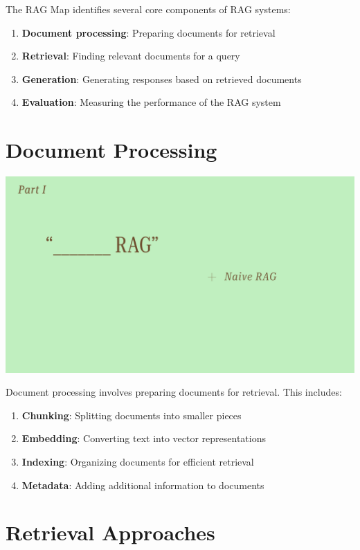 \documentclass[
  letterpaper,
  oneside]{scrbook}
\providecommand{\tightlist}{%
  \setlength{\itemsep}{0pt}\setlength{\parskip}{0pt}}\usepackage{longtable,booktabs,array}
\begin{document}
The RAG Map identifies several core components of RAG systems:

\begin{enumerate}
\def\labelenumi{\arabic{enumi}.}
\tightlist
\item
  \textbf{Document processing}: Preparing documents for retrieval
\item
  \textbf{Retrieval}: Finding relevant documents for a query
\item
  \textbf{Generation}: Generating responses based on retrieved documents
\item
  \textbf{Evaluation}: Measuring the performance of the RAG system
\end{enumerate}

\section{Document Processing}\label{document-processing}

\includegraphics{chapters/../p5-images/slide_3.png}

Document processing involves preparing documents for retrieval. This
includes:

\begin{enumerate}
\def\labelenumi{\arabic{enumi}.}
\tightlist
\item
  \textbf{Chunking}: Splitting documents into smaller pieces
\item
  \textbf{Embedding}: Converting text into vector representations
\item
  \textbf{Indexing}: Organizing documents for efficient retrieval
\item
  \textbf{Metadata}: Adding additional information to documents
\end{enumerate}

\section{Retrieval Approaches}\label{retrieval-approaches}
\end{document}
